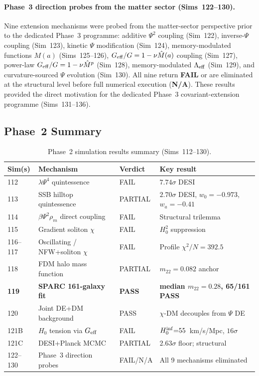 \documentclass[12pt,a4paper]{article}
\begin{document}
\paragraph{Phase~3 direction probes from the matter sector (Sims~122--130).}
Nine extension mechanisms were probed from the matter-sector perspective prior
to the dedicated Phase~3 programme: additive $\Psi^2$ coupling (Sim~122),
inverse-$\Psi$ coupling (Sim~123), kinetic $\Psi$ modification (Sim~124),
memory-modulated functions $M(a)$ (Sims~125--126),
$G_{\rm eff}/G=1-\nu\hat{M}(a)$ coupling (Sim~127), power-law
$G_{\rm eff}/G=1-\nu\hat{M}^p$ (Sim~128), memory-modulated $\Lambda_{\rm eff}$
(Sim~129), and curvature-sourced $\Psi$ evolution (Sim~130).  All nine return
\textbf{FAIL} or are eliminated at the structural level before full numerical
execution (\textbf{N/A}).  These results provided the direct motivation for the
dedicated Phase~3 covariant-extension programme (Sims~131--136).

\subsection{Phase~2 Summary}

\begin{table}[ht]
\centering
\begin{tabular}{lp{5.5cm}ll}
\hline
Sim(s) & Mechanism & Verdict & Key result \\
\hline
112 & $\lambda\Psi^4$ quintessence & FAIL & $7.74\sigma$ DESI \\
113 & SSB hilltop quintessence & PARTIAL & $2.70\sigma$ DESI, $w_0{=}-0.973$, $w_a{=}-0.41$ \\
114 & $\beta\Psi^2\rho_m$ direct coupling & FAIL & Structural trilemma \\
115 & Gradient soliton $\chi$ & FAIL & $H_0^2$ suppression \\
116--117 & Oscillating / NFW+soliton $\chi$ & FAIL & Profile $\chi^2/N{=}392.5$ \\
118 & FDM halo mass function & PARTIAL & $m_{22}{=}0.082$ anchor \\
\textbf{119} & \textbf{SPARC 161-galaxy fit} & \textbf{PASS} & \textbf{median $m_{22}{=}0.28$, 65/161 PASS} \\
120 & Joint DE+DM background & PASS & $\chi$-DM decouples from $\Psi$ DE \\
121B & $H_0$ tension via $G_{\rm eff}$ & FAIL & $H_0^{\rm inf}{=}55$~km/s/Mpc, $16\sigma$ \\
121C & DESI+Planck MCMC & PARTIAL & $2.63\sigma$ floor; structural \\
122--130 & Phase~3 direction probes & FAIL/N/A & All 9 mechanisms eliminated \\
\hline
\end{tabular}
\caption{Phase~2 simulation results summary (Sims~112--130).}
\label{tab:phase2}
\end{table}
\end{document}
